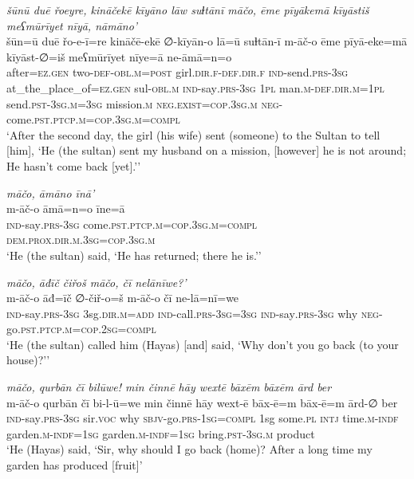 \ea \label{ŽH.110}
\textit{šūnū duē řoeyre, kināčekē kīyāno lāw suɫtānī māčo, ēme pīyākemā kīyāstiš meʕmūrīyet nīyā, nāmāno’} \\ 
\gll šūn=ū duē řo-e-ī=re kināčē-ekē ∅-kīyān-o lā=ū suɫtān-ī m-āč-o ēme pīyā-eke=mā kīyāst-∅=iš meʕmūrīyet nīye=ā ne-āmā=n=o \\ 
 after\textsc{=ez}\textsc{.gen} two\textsc{-def}\textsc{-obl}\textsc{.m}\textsc{=\textsc{post}} girl\textsc{.dir}\textsc{\textsc{.f}}\textsc{-def}\textsc{.dir}\textsc{\textsc{.f}} \textsc{ind-}send\textsc{.prs}\textsc{-3sg} at\_the\_place\_of\textsc{=ez}\textsc{.gen} sul\textsc{-obl}\textsc{.m} \textsc{ind-}say\textsc{.prs}\textsc{-3sg} \textsc{1pl} man\textsc{.m}\textsc{-def}\textsc{.dir}\textsc{.m}\textsc{=1pl} send\textsc{.pst}\textsc{-3sg}\textsc{.m}\textsc{=3sg} mission\textsc{.m} \textsc{\textsc{neg.}exist}\textsc{=cop}\textsc{.3sg}\textsc{.m} \textsc{neg-}come\textsc{.pst}\textsc{.ptcp}\textsc{.m}\textsc{=cop}\textsc{.3sg}\textsc{.m}\textsc{=compl} \\ 
\glt `After the second day, the girl (his wife) sent (someone) to the Sultan to tell [him], ‘He (the sultan) sent my husband on a mission, [however] he is not around; He hasn’t come back [yet].’'
\z 
 
\ea \label{ŽH.111}
\textit{māčo, āmāno īnā’} \\ 
\gll m-āč-o āmā=n=o īne=ā \\ 
 \textsc{ind-}say\textsc{.prs}\textsc{-3sg} come\textsc{.pst}\textsc{.ptcp}\textsc{.m}\textsc{=cop}\textsc{.3sg}\textsc{.m}\textsc{=compl} \textsc{dem.prox}\textsc{.dir}\textsc{.m}\textsc{.3sg}\textsc{=cop}\textsc{.3sg}\textsc{.m} \\ 
\glt `He (the sultan) said, ‘He has returned; there he is.’'
\z 
 
\ea \label{ŽH.112}
\textit{māčo, āđīč čiřoš māčo, čī nelānīwe?’} \\ 
\gll m-āč-o āđ=īč ∅-čiř-o=š m-āč-o čī ne-lā=nī=we \\ 
 \textsc{ind-}say\textsc{.prs}\textsc{-3sg} 3sg\textsc{.dir}\textsc{.m}\textsc{=add} \textsc{ind-}call\textsc{.prs}\textsc{-3sg}\textsc{=3sg} \textsc{ind-}say\textsc{.prs}\textsc{-3sg} why \textsc{neg-}go\textsc{.pst}\textsc{.ptcp}\textsc{.m}\textsc{=cop}\textsc{.\textsc{2sg}}\textsc{=compl} \\ 
\glt `He (the sultan) called him (Hayas) [and] said, ‘Why don’t you go back (to your house)?’'
\z 
 
\ea \label{ŽH.113}
\textit{māčo, qurbān čī bilūwe! min činnē hāy wextē bāxēm bāxēm ārd ber} \\ 
\gll m-āč-o qurbān čī bi-l-ū=we min činnē hāy wext-ē bāx-ē=m bāx-ē=m ārd-∅ ber \\ 
 \textsc{ind-}say\textsc{.prs}\textsc{-3sg} sir.\textsc{voc} why \textsc{sbjv-}go\textsc{.prs}\textsc{-1sg}\textsc{=compl} 1sg some\textsc{.pl} \textsc{intj} time\textsc{.m}\textsc{-indf} garden\textsc{.m}\textsc{-indf}\textsc{=1sg} garden\textsc{.m}\textsc{-indf}\textsc{=1sg} bring\textsc{.pst}\textsc{-3sg}\textsc{.m} product \\ 
\glt `He (Hayas) said, ‘Sir, why should I go back (home)? After a long time my garden has produced [fruit]'
\z 
 
